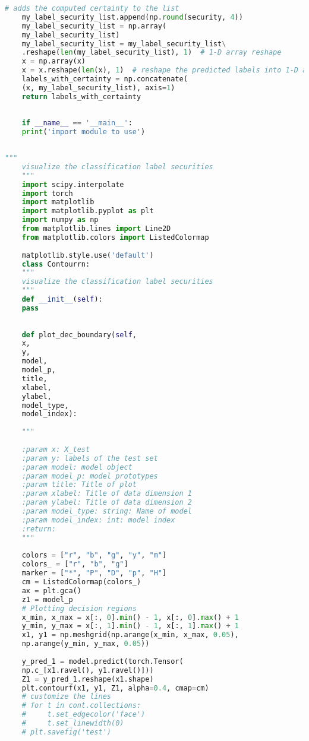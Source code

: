 \begin{lstlisting}[caption=label\textunderscore security1.py ,style=chstyle, language=Python]
	# adds the computed certainty to the list
	my_label_security_list.append(np.round(security, 4))
	my_label_security_list = np.array(
	my_label_security_list)
	my_label_security_list = my_label_security_list\
	.reshape(len(my_label_security_list), 1)  # 1-D array reshape
	x = np.array(x)
	x = x.reshape(len(x), 1)  # reshape the predicted labels into 1-D array
	labels_with_certainty = np.concatenate(
	(x, my_label_security_list), axis=1)
	return labels_with_certainty
	
	
	if __name__ == '__main__':
	print('import module to use')
	
\end{lstlisting}

\newpage
\begin{lstlisting}[caption = contour.py, style=chstyle, language=Python]
	"""
	visualize the classification label securities
	"""
	import scipy.interpolate
	import torch
	import matplotlib
	import matplotlib.pyplot as plt
	import numpy as np
	from matplotlib.lines import Line2D
	from matplotlib.colors import ListedColormap
	
	matplotlib.style.use('default')
	class Contourrn:
	"""
	visualize the classification label securities
	"""
	def __init__(self):
	pass
	
	
	def plot_dec_boundary(self,
	x,
	y,
	model,
	model_p,
	title,
	xlabel,
	ylabel,
	model_type,
	model_index):
	
	"""
	
	:param x: X_test
	:param y: labels of the test set
	:param model: model object
	:param model_p: model prototypes
	:param title: Title of plot
	:param xlabel: Title of data dimension 1
	:param ylabel: Title of data dimension 2
	:param model_type: string: Name of model
	:param model_index: int: model index
	:return: 
	"""
	
	colors = ["r", "b", "g", "y", "m"]
	colors_ = ["r", "b", "g"]
	marker = ["*", "P", "D", "p", "H"]
	cm = ListedColormap(colors_)
	ax = plt.gca()
	z1 = model_p
	# Plotting decision regions
	x_min, x_max = x[:, 0].min() - 1, x[:, 0].max() + 1
	y_min, y_max = x[:, 1].min() - 1, x[:, 1].max() + 1
	x1, y1 = np.meshgrid(np.arange(x_min, x_max, 0.05),
	np.arange(y_min, y_max, 0.05))
	
	y_pred_1 = model.predict(torch.Tensor(
	np.c_[x1.ravel(), y1.ravel()]))
	Z1 = y_pred_1.reshape(x1.shape)
	plt.contourf(x1, y1, Z1, alpha=0.4, cmap=cm)
	# customize the lines
	# for t in cont.collections:
	#     t.set_edgecolor('face')
	#     t.set_linewidth(0)
	# plt.savefig('test')
	

\end{lstlisting}
